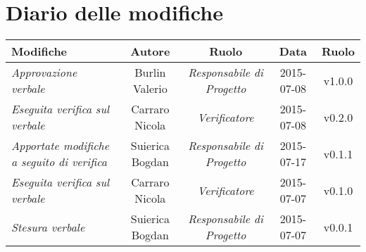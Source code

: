 \newpage
\section*{Diario delle modifiche}

\begin{table}[h]
\centering
\begin{tabular}{|p{}|c|c|c|c|}
	\toprule
		\textbf{Modifiche} & \textbf{Autore} & \textbf{Ruolo} & \textbf{Data} & \textbf{Ruolo} \\
	\midrule
	\midrule
		\textit{Approvazione verbale} & Burlin Valerio & \textit{Responsabile di Progetto} & 2015-07-08 & v1.0.0 \\									
	\midrule
		\textit{Eseguita verifica sul verbale} & Carraro Nicola & \textit{Verificatore} & 2015-07-08 & v0.2.0 \\
	\midrule
		\textit{Apportate modifiche a seguito di verifica} & Suierica Bogdan & \textit{Responsabile di Progetto} & 2015-07-17 & v0.1.1 \\
	\midrule
		\textit{Eseguita verifica sul verbale} & Carraro Nicola & \textit{Verificatore} & 2015-07-07 & v0.1.0 \\		                               
	\midrule
		\textit{Stesura verbale} & Suierica Bogdan & \textit{Responsabile di Progetto} & 2015-07-07 & v0.0.1 \\                         
	\bottomrule
\end{tabular}	
\end{table}

\newpage